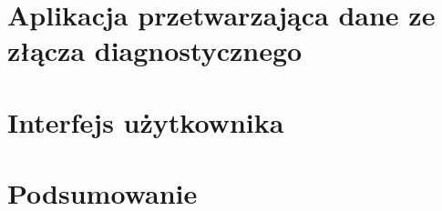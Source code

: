 \documentclass[12pt]{article} %
\numberwithin{equation}{subsection}
\numberwithin{figure}{section}
\numberwithin{table}{section}
\begin{document}
		\newpage
		
		
	
		\newpage
	
\section{Aplikacja przetwarzająca dane ze złącza diagnostycznego}
	\hspace{0.5cm}
	
	\newpage
	
	
\section{Interfejs użytkownika}
	\hspace{0.5cm}
	
	\newpage
	
\section{Podsumowanie}
	
	\hspace{0.5cm} 
	
	\newpage	
	
\end{document}
